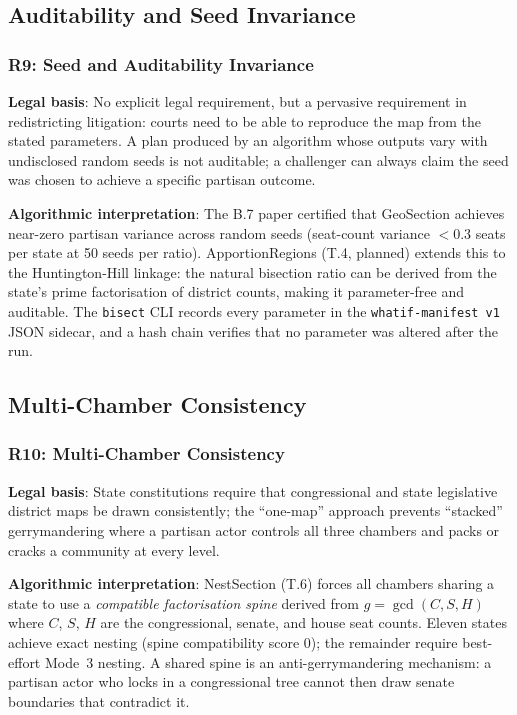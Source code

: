 \subsection{Auditability and Seed Invariance}

\subsubsection*{R9: Seed and Auditability Invariance}

\textbf{Legal basis}: No explicit legal requirement, but a pervasive requirement
in redistricting litigation: courts need to be able to reproduce the map from
the stated parameters.
A plan produced by an algorithm whose outputs vary with undisclosed random seeds
is not auditable; a challenger can always claim the seed was chosen to achieve
a specific partisan outcome.

\textbf{Algorithmic interpretation}: The B.7 paper certified that GeoSection
achieves near-zero partisan variance across random seeds (seat-count variance
$< 0.3$ seats per state at 50 seeds per ratio).
ApportionRegions (T.4, planned) extends this to the Huntington-Hill linkage:
the natural bisection ratio can be derived from the state's prime factorisation
of district counts, making it parameter-free and auditable.
The \texttt{bisect} CLI records every parameter in the \texttt{whatif-manifest v1}
JSON sidecar, and a hash chain verifies that no parameter was altered after
the run.

\subsection{Multi-Chamber Consistency}

\subsubsection*{R10: Multi-Chamber Consistency}

\textbf{Legal basis}: State constitutions require that congressional and state
legislative district maps be drawn consistently; the ``one-map'' approach prevents
``stacked'' gerrymandering where a partisan actor controls all three chambers and
packs or cracks a community at every level.

\textbf{Algorithmic interpretation}: NestSection (T.6) forces all chambers
sharing a state to use a \emph{compatible factorisation spine} derived from
$g = \gcd(C, S, H)$ where $C$, $S$, $H$ are the congressional, senate, and
house seat counts.
Eleven states achieve exact nesting (spine compatibility score 0); the remainder
require best-effort Mode~3 nesting.
A shared spine is an anti-gerrymandering mechanism: a partisan actor who locks
in a congressional tree cannot then draw senate boundaries that contradict it.


